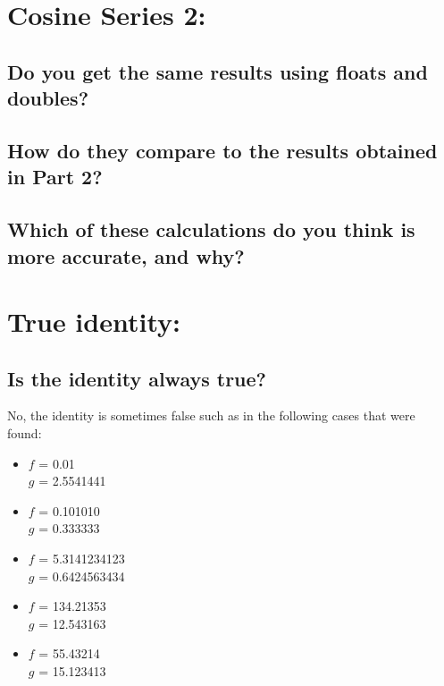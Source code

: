 \documentclass[12pt]{article}
\begin{document}
\section*{Cosine Series 2:}
\begin{itemize}
\subsection*{Do you get the same results using floats and doubles?}
\subsection*{How do they compare to the results obtained in Part 2?}
\subsection*{Which of these calculations do you think is more accurate, and why?}
\end{itemize}

\section*{True identity:}
\begin{itemize}
\subsection*{Is the identity always true?}
\end{itemize}
 No, the identity is sometimes false such as in the following cases that were found:\
\begin{itemize}
\begin{itemize}
\item $f$ = 0.01 \\ $g$ = 2.5541441
\\
\item $f$ = 0.101010 \\ $g$ = 0.333333
\\
\item $f$ = 5.3141234123 \\ $g$ = 0.6424563434
\\
\item $f$ = 134.21353 \\ $g$ = 12.543163
\\
\item $f$ = 55.43214 \\ $g$ = 15.123413
\end{itemize}
\end{itemize}
\\
\\
\end{document}
